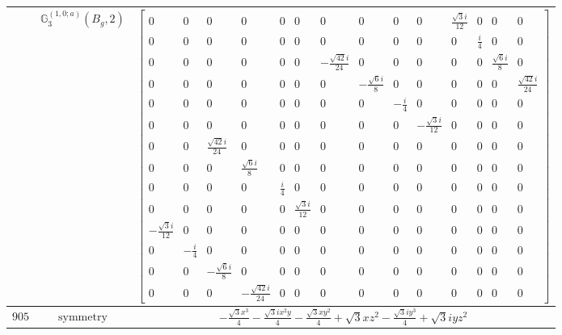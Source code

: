 \documentclass[fleqn,8pt,landscape]{jsarticle}
\begin{document}
\begin{longtable}{ccc}
$  $ & $ \mathbb{G}_{3}^{(1,0;a)}(B_{g},2) $ & $ \begin{bmatrix} 0 & 0 & 0 & 0 & 0 & 0 & 0 & 0 & 0 & 0 & \frac{\sqrt{3} i}{12} & 0 & 0 & 0 \\ 0 & 0 & 0 & 0 & 0 & 0 & 0 & 0 & 0 & 0 & 0 & \frac{i}{4} & 0 & 0 \\ 0 & 0 & 0 & 0 & 0 & 0 & - \frac{\sqrt{42} i}{24} & 0 & 0 & 0 & 0 & 0 & \frac{\sqrt{6} i}{8} & 0 \\ 0 & 0 & 0 & 0 & 0 & 0 & 0 & - \frac{\sqrt{6} i}{8} & 0 & 0 & 0 & 0 & 0 & \frac{\sqrt{42} i}{24} \\ 0 & 0 & 0 & 0 & 0 & 0 & 0 & 0 & - \frac{i}{4} & 0 & 0 & 0 & 0 & 0 \\ 0 & 0 & 0 & 0 & 0 & 0 & 0 & 0 & 0 & - \frac{\sqrt{3} i}{12} & 0 & 0 & 0 & 0 \\ 0 & 0 & \frac{\sqrt{42} i}{24} & 0 & 0 & 0 & 0 & 0 & 0 & 0 & 0 & 0 & 0 & 0 \\ 0 & 0 & 0 & \frac{\sqrt{6} i}{8} & 0 & 0 & 0 & 0 & 0 & 0 & 0 & 0 & 0 & 0 \\ 0 & 0 & 0 & 0 & \frac{i}{4} & 0 & 0 & 0 & 0 & 0 & 0 & 0 & 0 & 0 \\ 0 & 0 & 0 & 0 & 0 & \frac{\sqrt{3} i}{12} & 0 & 0 & 0 & 0 & 0 & 0 & 0 & 0 \\ - \frac{\sqrt{3} i}{12} & 0 & 0 & 0 & 0 & 0 & 0 & 0 & 0 & 0 & 0 & 0 & 0 & 0 \\ 0 & - \frac{i}{4} & 0 & 0 & 0 & 0 & 0 & 0 & 0 & 0 & 0 & 0 & 0 & 0 \\ 0 & 0 & - \frac{\sqrt{6} i}{8} & 0 & 0 & 0 & 0 & 0 & 0 & 0 & 0 & 0 & 0 & 0 \\ 0 & 0 & 0 & - \frac{\sqrt{42} i}{24} & 0 & 0 & 0 & 0 & 0 & 0 & 0 & 0 & 0 & 0 \end{bmatrix} $ \\ \hline
$ 905 $ & $ \text{symmetry} $ & $ - \frac{\sqrt{3} x^{3}}{4} - \frac{\sqrt{3} i x^{2} y}{4} - \frac{\sqrt{3} x y^{2}}{4} + \sqrt{3} x z^{2} - \frac{\sqrt{3} i y^{3}}{4} + \sqrt{3} i y z^{2} $ \\

\end{longtable}
\end{document}
